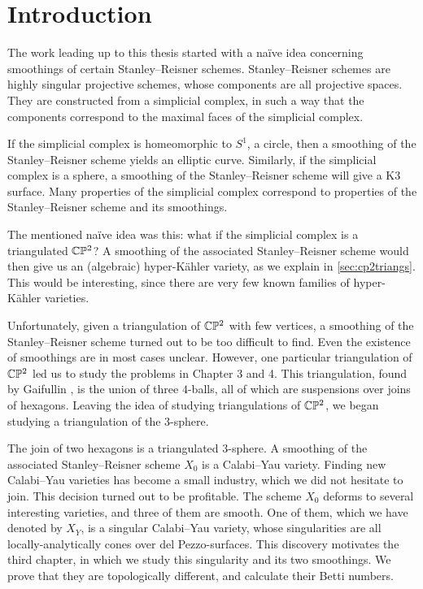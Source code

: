 \chapter{Introduction}
\label{sec:intro}

The work leading up to this thesis started with a naïve idea concerning smoothings of certain Stanley--Reisner schemes. Stanley--Reisner schemes are highly singular projective schemes, whose components are all projective spaces. They are constructed from a simplicial complex, in such a way that the components correspond to the maximal faces of the simplicial complex. 

If the simplicial complex is homeomorphic to $S^1$, a circle, then a smoothing of the Stanley--Reisner scheme yields an elliptic curve. Similarly, if the simplicial complex is a sphere, a smoothing of the Stanley--Reisner scheme will give a K3 surface. Many properties of the simplicial complex correspond to properties of the Stanley--Reisner scheme and its smoothings. 

The mentioned naïve idea was this: what if the simplicial complex is a triangulated $\mathbb{C} \mathbb{P}^2$? A smoothing of the associated Stanley--Reisner scheme would then give us an (algebraic) hyper-Kähler variety, as we explain in \cref{sec:cp2triangs}. This would be interesting, since there are very few known families of hyper-Kähler varieties.

Unfortunately, given a triangulation of $\mathbb{C} \mathbb{P}^2$ with few vertices, a smoothing of the Stanley--Reisner scheme turned out to be too difficult to find. Even the existence of smoothings are in most cases unclear. However, one particular triangulation of $\mathbb{C} \mathbb{P}^2$ led us to study the problems in Chapter 3 and 4. This triangulation, found by Gaifullin \cite{cp2_15_chess}, is the union of three $4$-balls, all of which are suspensions over joins of hexagons. Leaving the idea of studying triangulations of $\mathbb{C} \mathbb{P}^2$, we began studying a triangulation of the $3$-sphere.

The join of two hexagons is a triangulated $3$-sphere. A smoothing of the associated Stanley--Reisner scheme $X_0$ is a Calabi--Yau variety. Finding new Calabi--Yau varieties has become a small industry, which we did not hesitate to join. This decision turned out to be profitable. The scheme $X_0$ deforms to several interesting varieties, and three of them are smooth. One of them, which we have denoted by $X_Y$, is a singular Calabi--Yau variety, whose singularities are all locally-analytically cones over del Pezzo-surfaces. This discovery motivates the third chapter, in which we study this singularity and its two smoothings. We prove that they are topologically different, and calculate their Betti numbers.

